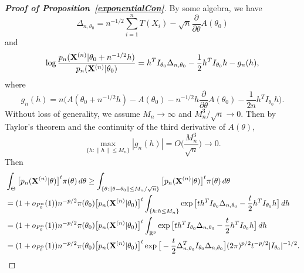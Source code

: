 \documentclass[3p]{elsarticle}
\theoremstyle{plain}
\theoremstyle{definition}
\theoremstyle{remark}
\begin{document}
\begin{appendices}
\begin{proof}[\textbf{Proof of Proposition~\ref{exponentialCon}}]
    By some algebra, we have
    $$
    \Delta_{n,\theta_0}=n^{-1/2}\sum_{i=1}^n T(X_i)-\sqrt{n}\frac{\partial}{\partial \theta} A(\theta_0)
    $$
    and
    $$
    \log\frac{p_n(\mathbf{X}^{(n)}|\theta_0+n^{-1/2}h)}{p_n(\mathbf{X}^{(n)}|\theta_0)}
    =h^T I_{\theta_0} \Delta_{n,\theta_0}-\frac{1}{2} h^T I_{\theta_0} h-
    g_n(h),
    $$
    where
    $$
    g_n(h)=n\Big(A(\theta_0+n^{-1/2}h)-A(\theta_0)-n^{-1/2}h \frac{\partial}{\partial \theta}A(\theta_0)-\frac{1}{2n}h^T I_{\theta_0}h\Big).
    $$
    Without loss of generality, we assume $M_n\to \infty$ and $M_n^3/\sqrt{n}\to 0$.
    Then by Taylor's theorem and the continuity of the third derivative of $A(\theta)$, 
    $$
        \max_{\{h:\|h\|\leq M_n\}}|g_n(h)|=O\Big(\frac{M_n^3}{\sqrt{n}}\Big)\to 0.
    $$
    Then
$$
    \begin{aligned}
        &\int_{\Theta} \big[p_n(\mathbf{X}^{(n)}|\theta)\big]^t \pi(\theta)\, d\theta
        \geq
        \int_{\{\theta:\|\theta-\theta_0\|\leq M_n/\sqrt{n}\}} \big[p_n(\mathbf{X}^{(n)}|\theta)\big]^t \pi(\theta)\, d\theta
        \\
        &=
        (1+o_{P_0^n}(1))n^{-p/2}\pi(\theta_0)\big[p_n(\mathbf{X}^{(n)}|\theta_0)\big]^t\int_{\{h:h\leq M_n\}} \exp\big[ t h^T I_{\theta_0}\Delta_{n,\theta_0}-\frac{t}{2}h^T I_{\theta_0}h\big] \, dh
        \\
        &=
        (1+o_{P_0^n}(1))n^{-p/2}\pi(\theta_0) \big[p_n(\mathbf{X}^{(n)}|\theta_0)\big]^t\int_{\mathbb{R}^p} \exp\big[t h^T I_{\theta_0}\Delta_{n,\theta_0}-\frac{t}{2}h^T I_{\theta_0}h\big] \, dh
        \\
        &=
        (1+o_{P_0^n}(1))n^{-p/2}\pi(\theta_0)\big[p_n(\mathbf{X}^{(n)}|\theta_0)\big]^t
        \exp\big[-\frac{t}{2}\Delta_{n,\theta_0}^T I_{\theta_0}\Delta_{n,\theta_0}\big]
        (2\pi)^{p/2} t^{-p/2}  |I_{\theta_0}|^{-1/2}.
    \end{aligned}
$$


\end{proof}
\end{appendices}
\end{document}
